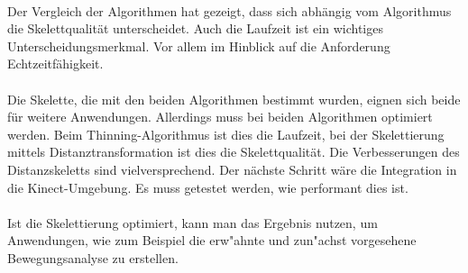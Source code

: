 \\
Der Vergleich der Algorithmen hat gezeigt, dass sich abhängig vom Algorithmus die Skelettqualität unterscheidet. Auch die 
Laufzeit ist ein wichtiges Unterscheidungsmerkmal. Vor allem im Hinblick auf die Anforderung Echtzeitfähigkeit.\\\\
Die Skelette, die mit den beiden Algorithmen bestimmt wurden, eignen sich beide für weitere Anwendungen. Allerdings muss bei beiden Algorithmen optimiert werden. Beim Thinning-Algorithmus ist dies die Laufzeit, bei der Skelettierung mittels Distanztransformation ist dies die Skelettqualität. Die Verbesserungen des Distanzskeletts sind vielversprechend. Der nächste Schritt wäre die Integration in die Kinect-Umgebung. Es muss
getestet werden, wie performant dies ist. \\\\ Ist die Skelettierung optimiert, kann man das Ergebnis nutzen, um Anwendungen, wie zum Beispiel die erw"ahnte und zun"achst vorgesehene Bewegungsanalyse zu erstellen.